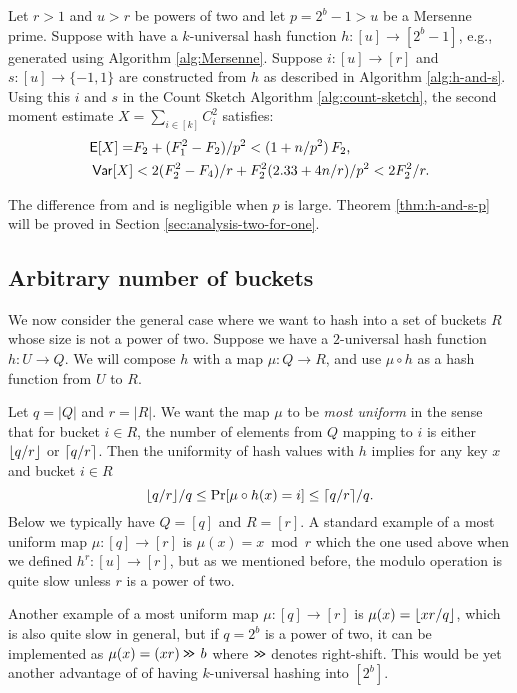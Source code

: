 \begin{theorem}\label{thm:h-and-s-p}
   Let $r>1$ and $u>r$ be powers of two and let $p=2^b-1>u$ be a
   Mersenne prime.
   Suppose with have a $k$-universal hash function $h:[u]\to[2^b-1]$, e.g.,
   generated using Algorithm \ref{alg:Mersenne}. Suppose
   $i:[u]\to[r]$ and
   $s:[u]\to\{-1,1\}$ are constructed from $h$ as described in
   Algorithm \ref{alg:h-and-s}. Using this $i$ and $s$ 
   in the Count Sketch Algorithm \ref{alg:count-sketch}, the second moment 
   estimate $X=\sum_{i\in[k]} C_i^2$ satisfies:
   \begin{align}
      \operatorname*{\sf{E}}[X]=&F_2+(F_1^2-F_2)/p^2 < (1+n/p^2)\,F_2\textnormal,\label{eq:E-F2-p}\\
      {\sf Var}[X]&< 2(F_2^2-F_4)/r+F_2^2 (2.33+4 n/r)/p^2<2F_2^2/r.\label{eq:V-F2-p}
   \end{align}
\end{theorem}
The difference from  and  
is negligible when $p$ is large. Theorem \ref{thm:h-and-s-p} will be
proved in Section \ref{sec:analysis-two-for-one}.


\subsection{Arbitrary number of buckets}\label{sec:most-uniform}
We now consider the general case where we want to hash into a set of
buckets $R$ whose size is not a power of two. Suppose we have a
$2$-universal hash function $h:U\to Q$. We will compose $h$ with a
map $\mu:Q\to R$, and use $\mu\circ h$ as a hash function from
$U$ to $R$.

Let $q=|Q|$ and $r=|R|$. We want the map $\mu$ to be \emph{most
uniform} in the sense that for bucket $i\in R$, the number of
elements from $Q$ mapping to $i$ is either $\lfloor {q/r} \rfloor$ or
$\lceil {q/r}\rceil$. Then the uniformity of hash values with $h$ implies for
any key $x$ and bucket $i\in R$
\[\lfloor {q/r} \rfloor/q\leq \Pr[\mu\circ
h(x)=i]\leq \lceil {q/r}\rceil/q.\]
Below we typically have $Q=[q]$ and $R=[r]$. A standard example of a most uniform map $\mu:[q]\to[r]$ 
is $\mu(x)=x\bmod r$ which the one used above when we defined 
$h^r:[u]\to[r]$, but as we mentioned before, the modulo operation is 
quite slow unless $r$ is a power of two.

Another example of a most uniform map $\mu:[q]\to[r]$ 
is $\mu(x)=\lfloor {xr/q} \rfloor$,
which is also quite slow in general, but if $q=2^b$ is a power of two,
it can be implemented as $\mu(x)=(xr)\mathbin{\texttt{>\!>}}\,b$ where 
$\mathbin{\texttt{>\!>}}$ denotes right-shift. This would be yet another advantage 
of of having $k$-universal hashing into $[2^b]$.


